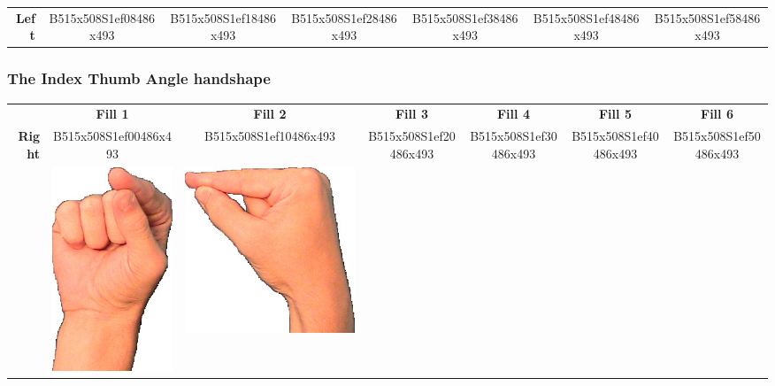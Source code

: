 \documentclass{article}
\begin{document}
\begin{center}
\begin{tabular}{r*{6}{c}}
\textbf{Left}&
B515x508S1ef08486x493&
B515x508S1ef18486x493&
B515x508S1ef28486x493&
B515x508S1ef38486x493&
B515x508S1ef48486x493&
B515x508S1ef58486x493\\
\end{tabular}
\end{center}

\subsubsection{The Index Thumb Angle handshape}

\begin{center}
\begin{tabular}{r*{6}{c}}
&\textbf{Fill 1}&\textbf{Fill 2}&\textbf{Fill 3}&\textbf{Fill 4}&\textbf{Fill 5}&\textbf{Fill 6}\\
\multirow{2}{*}{\textbf{Right}}&
B515x508S1ef00486x493&
B515x508S1ef10486x493&
B515x508S1ef20486x493&
B515x508S1ef30486x493&
B515x508S1ef40486x493&
B515x508S1ef50486x493\\
&
\includegraphics[scale=0.1]{images/09-13-1.jpg}&
\includegraphics[scale=0.1]{images/09-13-2.jpg}&

\end{tabular}
\end{center}
\end{document}
